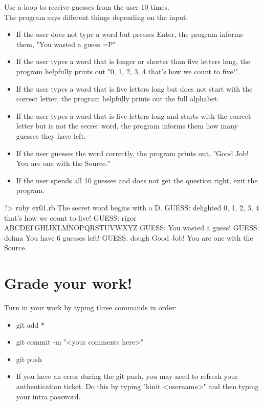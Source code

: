 \documentclass{42-en}
\begin{document}
Use a loop to receive guesses from the user 10 times.\\

The program says different things depending on the input:

\begin{itemize}
	\item If the user does not type a word but presses Enter, the program informs them, "You wasted a guess =P"
	\item If the user types a word that is longer or shorter than five letters long, the program helpfully prints out "0, 1, 2, 3, 4 that's how we count to five!". 
	\item If the user types a word that is five letters long but does not start with the correct letter, the program helpfully prints out the full alphabet.
	\item If the user types a word that is five letters long and starts with the correct letter but is not the secret word, the program informs them how many guesses they have left.
	\item If the user guesses the word correctly, the program prints out, "Good Job! You are one with the Source."
	\item If the user spends all 10 guesses and does not get the question right, exit the program.
\end{itemize}

\begin{42console}
	?> ruby ex01.rb
	The secret word begins with a D.
	GUESS: delighted
	0, 1, 2, 3, 4 that's how we count to five!
	GUESS: rigor
	ABCDEFGHIJKLMNOPQRSTUVWXYZ
	GUESS:
	You wasted a guess!
	GUESS: dolma
	You have 6 guesses left!
	GUESS: dough
	Good Job! You are one with the Source.
\end{42console}


\chapter{Grade your work!}

Turn in your work by typing three commands in order: 
\begin{itemize}
	\item git add *
	\item git commit -m "<your comments here>"
	\item git push
	\item If you have an error during the git push, you may need to refresh your authentication ticket. Do this by typing "kinit <username>" and then typing your intra password.
\end{itemize}
\end{document}
